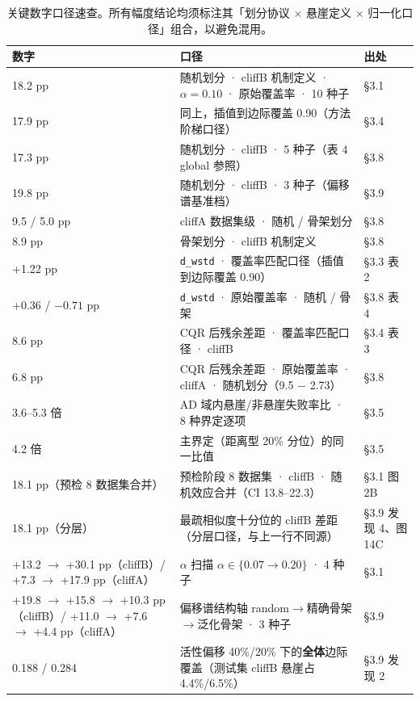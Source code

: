 \documentclass[UTF8, 11pt, a4paper]{ctexart}
\newcommand{\sig}[1]{\texttt{#1}}
\begin{document}
\begin{table}[htbp]
  \centering
  \caption{关键数字口径速查。所有幅度结论均须标注其「划分协议 $\times$ 悬崖定义 $\times$ 归一化口径」组合，以避免混用。}
  \label{tab:audit}
  \begin{tabularx}{\textwidth}{@{} p{4.4cm} X p{1.9cm} @{}}
    \toprule
    数字 & 口径 & 出处 \\
    \midrule
    18.2 pp & 随机划分 · cliffB 机制定义 · $\alpha=0.10$ · 原始覆盖率 · 10 种子 & §3.1 \\
    17.9 pp & 同上，插值到边际覆盖 0.90（方法阶梯口径） & §3.4 \\
    17.3 pp & 随机划分 · cliffB · 5 种子（表 4 global 参照） & §3.8 \\
    19.8 pp & 随机划分 · cliffB · 3 种子（偏移谱基准档） & §3.9 \\
    9.5 / 5.0 pp & cliffA 数据集级 · 随机 / 骨架划分 & §3.8 \\
    8.9 pp & 骨架划分 · cliffB 机制定义 & §3.8 \\
    +1.22 pp & \sig{d\_wstd} · 覆盖率匹配口径（插值到边际覆盖 0.90） & §3.3 表 2 \\
    +0.36 / $-0.71$ pp & \sig{d\_wstd} · 原始覆盖率 · 随机 / 骨架 & §3.8 表 4 \\
    8.6 pp & CQR 后残余差距 · 覆盖率匹配口径 · cliffB & §3.4 表 3 \\
    6.8 pp & CQR 后残余差距 · 原始覆盖率 · cliffA · 随机划分（9.5 $-$ 2.73） & §3.8 \\
    3.6–5.3 倍 & AD 域内悬崖/非悬崖失败率比 · 8 种界定逐项 & §3.5 \\
    4.2 倍 & 主界定（距离型 20\% 分位）的同一比值 & §3.5 \\
    18.1 pp（预检 8 数据集合并） & 预检阶段 8 数据集 · cliffB · 随机效应合并（CI 13.8–22.3） & §3.1 图 2B \\
    18.1 pp（分层） & 最疏相似度十分位的 cliffB 差距（分层口径，与上一行不同源） & §3.9 发现 4、图 14C \\
    +13.2 $\to$ +30.1 pp（cliffB）/ +7.3 $\to$ +17.9 pp（cliffA） & $\alpha$ 扫描 $\alpha\in\{0.07\to0.20\}$ · 4 种子 & §3.1 \\
    +19.8 $\to$ +15.8 $\to$ +10.3 pp（cliffB）/ +11.0 $\to$ +7.6 $\to$ +4.4 pp（cliffA） & 偏移谱结构轴 random$\to$精确骨架$\to$泛化骨架 · 3 种子 & §3.9 \\
    0.188 / 0.284 & 活性偏移 40\%/20\% 下的\textbf{全体}边际覆盖（测试集 cliffB 悬崖占 4.4\%/6.5\%） & §3.9 发现 2 \\

\end{tabularx}
\end{table}
\end{document}
